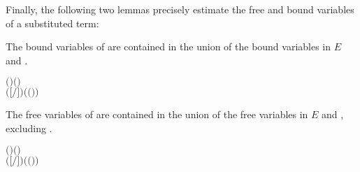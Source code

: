 Finally, the following two lemmas precisely estimate the free and
bound variables of a substituted term:
\begin{lemma}
The bound variables of 
are contained in the union of the bound variables in $E$ and .
\begin{alltt}
\HOLTokenTurnstile{}   \HOLSymConst{\HOLTokenConj{}}   \HOLSymConst{\ensuremath{=}}   \HOLSymConst{\HOLTokenConj{}}  \ensuremath{(} \ensuremath{)} \ensuremath{(} \ensuremath{)} \HOLSymConst{\HOLTokenImp{}}
    \ensuremath{(}\ensuremath{[}\ensuremath{/}\ensuremath{]} \ensuremath{)} \HOLSymConst{\HOLTokenSubset{}}   \HOLSymConst{\HOLTokenUnion{}}  \ensuremath{(}  \ensuremath{(} \ensuremath{)}\ensuremath{)}
\end{alltt}
\end{lemma}

\begin{lemma}
The free variables of 
are contained in the union of the free variables in $E$ and ,
excluding .
\begin{alltt}
\HOLTokenTurnstile{}   \HOLSymConst{\HOLTokenConj{}}   \HOLSymConst{\ensuremath{=}}   \HOLSymConst{\HOLTokenConj{}}  \ensuremath{(} \ensuremath{)} \ensuremath{(} \ensuremath{)} \HOLSymConst{\HOLTokenImp{}}
    \ensuremath{(}\ensuremath{[}\ensuremath{/}\ensuremath{]} \ensuremath{)} \HOLSymConst{\HOLTokenSubset{}}      \HOLSymConst{\HOLTokenUnion{}}  \ensuremath{(}  \ensuremath{(} \ensuremath{)}\ensuremath{)}
\end{alltt}
\end{lemma}

